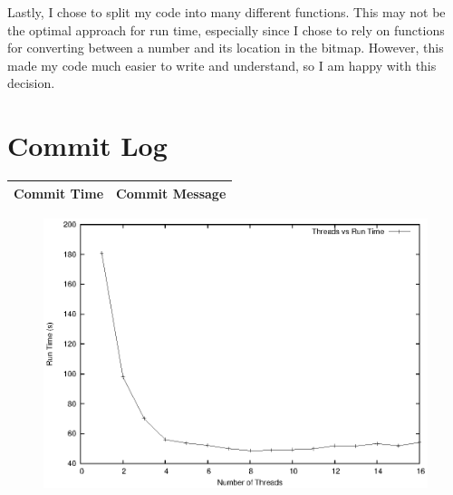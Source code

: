 \documentclass[letterpaper,10pt,twocolumn,titlepage]{article}
\begin{document}
Lastly, I chose to split my code into many different functions. This may not be the optimal approach for run time, especially since I
chose to rely on functions for converting between a number and its location in the bitmap. However, this made my code much easier to 
write and understand, so I am happy with this decision.

\vfill\break

\section{Commit Log}

\begin{tabular}{ | p{3cm} | p{5.5cm} | }
	\hline
	Commit Time & Commit Message \\ \hline
	
\end{tabular}


\newpage
\newpage
\clearpage
\newpage
\clearpage
\clearpage
\newpage
\fancyhead{}

\begin{figure}[t!]
\includegraphics{time_graph.eps}
\end{figure}
\end{document}
